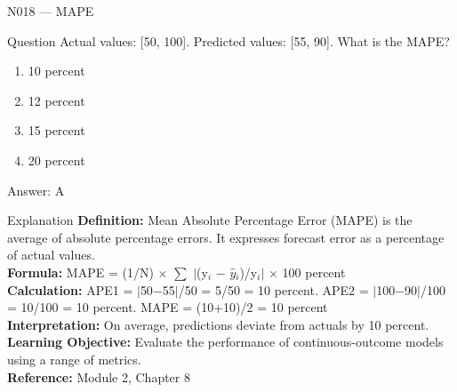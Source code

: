 \documentclass[aspectratio=169,8pt]{beamer}
\begin{document}
	\begin{frame}{N018 --- MAPE}
		\begin{block}{Question}
			Actual values: [50, 100]. Predicted values: [55, 90]. What is the MAPE?
			\begin{enumerate}
				\item 10 percent
				\item 12 percent
				\item 15 percent
				\item 20 percent
			\end{enumerate}
		\end{block}
		\begin{exampleblock}{Answer: A}\end{exampleblock}
		\begin{block}{Explanation}
			\textbf{Definition:} Mean Absolute Percentage Error (MAPE) is the average of absolute percentage errors. It expresses forecast error as a percentage of actual values.\\
			\textbf{Formula:} MAPE = (1/N) $\times$ $\sum$ $|$(y$_{i}$ $-$ $\hat{y}$$_{i}$)/y$_{i}$$|$ $\times$ 100 percent\\
			\textbf{Calculation:} APE1 = $|$50$-$55$|$/50 = 5/50 = 10 percent. APE2 = $|$100$-$90$|$/100 = 10/100 = 10 percent. MAPE = (10+10)/2 = 10 percent\\
			\textbf{Interpretation:} On average, predictions deviate from actuals by 10 percent.\\
			\textbf{Learning Objective:} Evaluate the performance of continuous-outcome models using a range of metrics.\\
			\textbf{Reference:} Module 2, Chapter 8
		\end{block}
	\end{frame}
	
\end{document}
